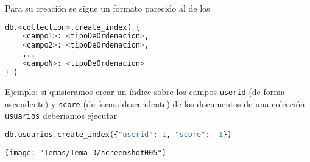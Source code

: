 Para su creación se sigue un formato parecido al de los 
\begin{lstlisting}[language=python]
db.<collection>.create_index( {
	<campo1>: <tipoDeOrdenacion>,
	<campo2>: <tipoDeOrdenacion>,
	...
	<campoN>: <tipoDeOrdenacion>
} )
\end{lstlisting}
Ejemplo: si quisieramos crear un índice sobre los campos \texttt{userid} (de forma ascendente) y \texttt{score} (de forma descendente) de los documentos de una colección \texttt{usuarios} deberíamos ejecutar
\begin{lstlisting}[language=python]
	db.usuarios.create_index({"userid": 1, "score": -1})
\end{lstlisting}
\begin{center}
	\texttt{[image: "Temas/Tema 3/screenshot005"]}
\end{center}
